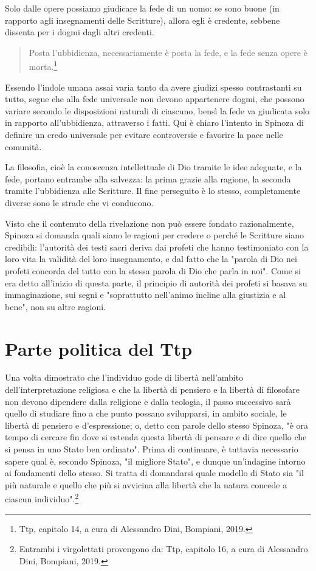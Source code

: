 Solo dalle opere possiamo giudicare la fede di un uomo: se sono buone (in rapporto agli insegnamenti delle Scritture), allora egli è credente, sebbene dissenta per i dogmi dagli altri credenti.

\begin{quotation}
	\small Posta l'ubbidienza, necessariamente è posta la fede, e la fede senza opere è morta.\footnote{Ttp, capitolo 14, a cura di Alessandro Dini, Bompiani, 2019.}
\end{quotation}

Essendo l'indole umana assai varia tanto da avere giudizi spesso contrastanti su tutto, segue che alla fede universale non devono appartenere dogmi, che possono variare secondo le disposizioni naturali di ciascuno, bensì la fede va giudicata solo in rapporto all'ubbidienza, attraverso i fatti. Qui è chiaro l'intento in Spinoza di definire un credo universale per evitare controversie e favorire la pace nelle comunità.

La filosofia, cioè la conoscenza intellettuale di Dio tramite le idee adeguate, e la fede, portano entrambe alla salvezza: la prima grazie alla ragione, la seconda tramite l'ubbidienza alle Scritture. Il fine perseguito è lo stesso, completamente diverse sono le strade che vi conducono.

Visto che il contenuto della rivelazione non può essere fondato razionalmente, Spinoza si domanda quali siano le ragioni per credere  o perché le Scritture siano credibili: l'autorità dei testi sacri deriva dai profeti che hanno testimoniato con la loro vita la validità del loro insegnamento, e dal fatto che la "parola di Dio nei profeti concorda del tutto con la stessa parola di Dio che parla in noi".
Come si era detto all'inizio di questa parte, il principio di autorità dei profeti si basava su immaginazione, sui segni e "soprattutto nell'animo incline alla giustizia e al bene", non su altre ragioni.

\section[Parte politica]{Parte politica del Ttp}

Una volta dimostrato che l’individuo gode di libertà nell’ambito dell’interpretazione religiosa e che la libertà di pensiero e la libertà
di filosofare non devono dipendere dalla religione e dalla teologia, il passo successivo sarà quello di studiare fino a che punto possano svilupparsi, in ambito
sociale, le libertà di pensiero e d’espressione; o, detto con parole dello stesso
Spinoza, "è ora tempo di cercare fin dove si estenda questa libertà di pensare
e di dire quello che si pensa in uno Stato ben ordinato". Prima di continuare, è tuttavia necessario sapere qual è, secondo Spinoza, "il migliore Stato", e
dunque un’indagine intorno ai fondamenti dello stesso. Si tratta di domandarsi
quale modello di Stato sia "il più naturale e quello che più si avvicina alla libertà che la natura concede a ciascun individuo".\footnote{Entrambi i virgolettati provengono da: Ttp, capitolo 16, a cura di Alessandro Dini, Bompiani, 2019.}

